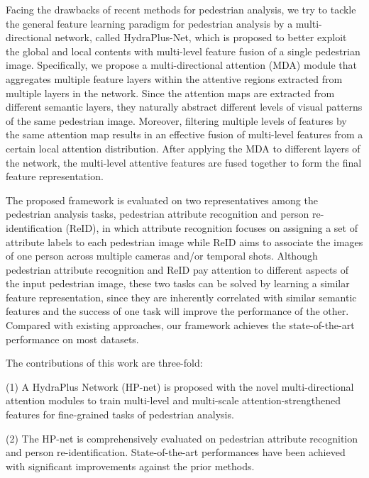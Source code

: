 \documentclass[10pt,twocolumn,letterpaper]{article}
\begin{document}
Facing the drawbacks of recent methods for pedestrian analysis, we try to tackle the general feature learning paradigm for pedestrian analysis by a multi-directional network, called HydraPlus-Net, which is proposed to better exploit the global and local contents with multi-level feature fusion of a single pedestrian image.
Specifically, we propose a multi-directional attention (MDA) module that aggregates multiple feature layers within the attentive regions extracted from multiple layers in the network.
Since the attention maps are extracted from different semantic layers, they naturally abstract different levels of visual patterns of the same pedestrian image.
Moreover, filtering multiple levels of features by the same attention map results in an effective fusion of multi-level features from a certain local attention distribution.
After applying the MDA to different layers of the network, the multi-level attentive features are fused together to form the final feature representation.





The proposed framework is evaluated on two representatives among the pedestrian analysis tasks, \ie pedestrian attribute recognition and person re-identification (ReID), in which attribute recognition focuses on assigning a set of attribute labels to each pedestrian image while ReID aims to associate the images of one person across multiple cameras and/or temporal shots.
Although pedestrian attribute recognition and ReID pay attention to different aspects of the input pedestrian image, these two tasks can be solved by learning a similar feature representation, since they are inherently correlated with similar semantic features and the success of one task will improve the performance of the other.
Compared with existing approaches, our framework achieves the state-of-the-art performance on most datasets.





The contributions of this work are three-fold:

(1) A HydraPlus Network (HP-net) is proposed with the novel multi-directional attention modules to train multi-level and multi-scale attention-strengthened features for fine-grained tasks of pedestrian analysis.

(2) The HP-net is comprehensively evaluated on pedestrian attribute recognition and person re-identification.
State-of-the-art performances have been achieved with significant improvements against the prior methods.
\end{document}
